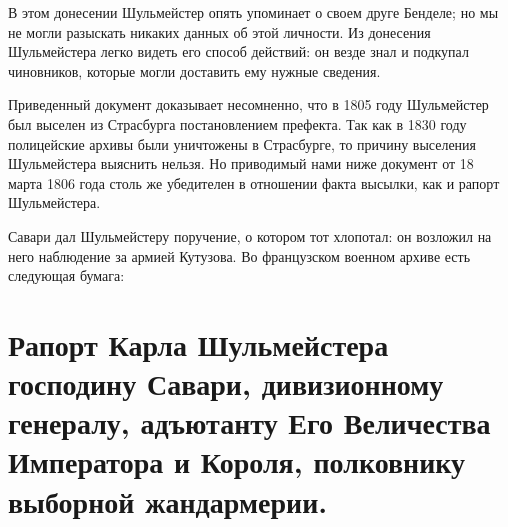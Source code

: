 \documentclass[
  oneside,
  12pt,
  titlepage]{book}
\begin{document}
В этом донесении Шульмейстер опять упоминает о своем друге Бенделе; но мы не могли разыскать никаких данных об этой личности. Из донесения Шульмейстера легко видеть его способ действий: он везде знал и подкупал чиновников, которые могли доставить ему нужные сведения.

Приведенный документ доказывает несомненно, что в 1805 году Шульмейстер был выселен из Страсбурга постановлением префекта. Так как в 1830 году полицейские архивы были уничтожены в Страсбурге, то причину выселения Шульмейстера выяснить нельзя. Но приводимый нами ниже документ от 18 марта 1806 года столь же убедителен в отношении факта высылки, как и рапорт Шульмейстера.

Савари дал Шульмейстеру поручение, о котором тот хлопотал: он возложил на него наблюдение за армией Кутузова. Во французском военном архиве есть следующая бумага:

\hypertarget{ux440ux430ux43fux43eux440ux442-ux43aux430ux440ux43bux430-ux448ux443ux43bux44cux43cux435ux439ux441ux442ux435ux440ux430-ux433ux43eux441ux43fux43eux434ux438ux43dux443-ux441ux430ux432ux430ux440ux438-ux434ux438ux432ux438ux437ux438ux43eux43dux43dux43eux43cux443-ux433ux435ux43dux435ux440ux430ux43bux443-ux430ux434ux44aux44eux442ux430ux43dux442ux443-ux435ux433ux43e-ux432ux435ux43bux438ux447ux435ux441ux442ux432ux430-ux438ux43cux43fux435ux440ux430ux442ux43eux440ux430-ux438-ux43aux43eux440ux43eux43bux44f-ux43fux43eux43bux43aux43eux432ux43dux438ux43aux443-ux432ux44bux431ux43eux440ux43dux43eux439-ux436ux430ux43dux434ux430ux440ux43cux435ux440ux438ux438.}{%
\section{Рапорт Карла Шульмейстера господину Савари, дивизионному генералу, адъютанту Его Величества Императора и Короля, полковнику выборной жандармерии.}\label{ux440ux430ux43fux43eux440ux442-ux43aux430ux440ux43bux430-ux448ux443ux43bux44cux43cux435ux439ux441ux442ux435ux440ux430-ux433ux43eux441ux43fux43eux434ux438ux43dux443-ux441ux430ux432ux430ux440ux438-ux434ux438ux432ux438ux437ux438ux43eux43dux43dux43eux43cux443-ux433ux435ux43dux435ux440ux430ux43bux443-ux430ux434ux44aux44eux442ux430ux43dux442ux443-ux435ux433ux43e-ux432ux435ux43bux438ux447ux435ux441ux442ux432ux430-ux438ux43cux43fux435ux440ux430ux442ux43eux440ux430-ux438-ux43aux43eux440ux43eux43bux44f-ux43fux43eux43bux43aux43eux432ux43dux438ux43aux443-ux432ux44bux431ux43eux440ux43dux43eux439-ux436ux430ux43dux434ux430ux440ux43cux435ux440ux438ux438.}}
\end{document}
